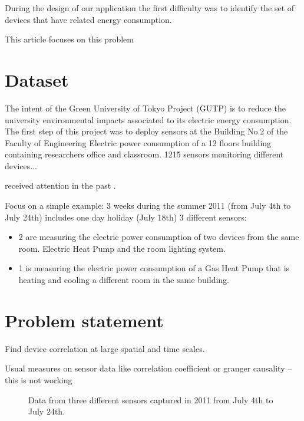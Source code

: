 \documentclass[letter,10pt]{sig-alternate-10pt}
\begin{document}
During the design of our application the first difficulty was to identify the set of devices that have related energy consumption.

This article focuses on this problem

\newpage

\section{Dataset}
The intent of the Green University of Tokyo Project (GUTP) \cite{gutp} is to reduce the university environmental impacts associated to its electric energy consumption.
The first step of this project was to deploy sensors at the Building No.2 of the Faculty of Engineering 
Electric power consumption of a 12 floors building containing researchers office and classroom.
1215 sensors monitoring different devices...

received attention in the past \cite{ogawa:lncs2011}.

Focus on a simple example: 3 weeks during the summer 2011 (from July 4th to July 24th)
includes one day holiday (July 18th)
3 different sensors:
\begin{itemize}
 \item 2 are measuring the electric power consumption of two devices from the same room. Electric Heat Pump and the room lighting system.
 \item 1 is measuring the electric power consumption of a Gas Heat Pump that is heating and cooling a different room in the same building.
\end{itemize}

\section{Problem statement}\label{problem}
Find device correlation at large spatial and time scales.

Usual measures on sensor data like correlation coefficient or granger causality \cite{kim:buildsys2010}
-- this is not working


\begin{figure}
 \caption{Data from three different sensors captured in 2011 from July 4th to July 24th.}
 \label{fig:raw}
\end{figure}
\end{document}
